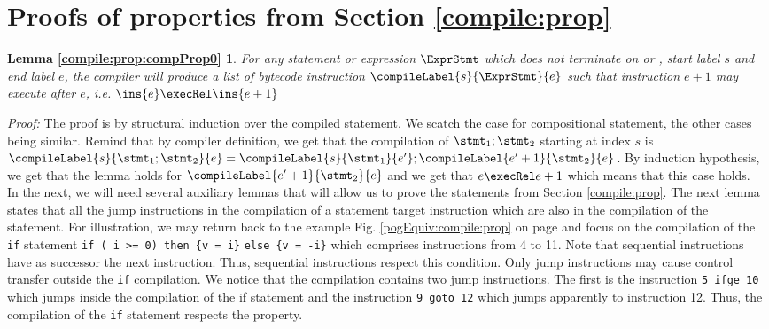 \newtheorem{compPropApp}{Lemma}[section]

\newtheorem*{compProp0A}{Lemma  \ref{compile:prop:compProp0}}
\newtheorem*{compProp3A}{Lemma  \ref{compile:prop:compProp3}}
\newtheorem*{compProp8A}{Lemma  \ref{compile:prop:compProp8}}
\newtheorem*{compProp9A}{Lemma  \ref{compile:prop:compProp4}}

\section{Proofs of properties from Section \ref{compile:prop} }\label{appendix:compile:prop}


\begin{compProp0A}%
 For any statement or expression $\ExprStmt$ which does not terminate on \return{} or \athrow, start label $s$ and end label $e$,
    the compiler will produce a list of bytecode instruction $\compileLabel{s}{\ExprStmt}{e}$ such that  instruction  $e+1$ may execute after
    $e$, i.e.   $ \ins{e} \execRel \ins{e+1}$
\end{compProp0A}
\textit{Proof:} 
The proof  is by structural induction over the compiled statement.
We scatch the case for compositional statement, the other cases being similar. 
Remind that by compiler definition, we get that the compilation of $\stmt_1; \stmt_2$ starting at index $s$ is
 $\compileLabel{s}{\stmt_1; \stmt_2}{e} = \compileLabel{s}{\stmt_1}{e'};\compileLabel{e'+1}{\stmt_2}{e}$.
By  induction hypothesis, we get that the lemma holds for $\compileLabel{e'+1}{\stmt_2}{e}$ and we get that $e \execRel e+1$ 
which means that this case holds.
\Qed \\


In the next, we will need several auxiliary lemmas that will allow us to prove the statements from Section \ref{compile:prop}. 
The next lemma states that all the jump instructions in the compilation of a statement target instruction which are also 
in the compilation of the statement.
For illustration, we may return back to the example Fig. \ref{pogEquiv:compile:prop}  on page \pageref{pogEquiv:compile:prop} and focus on the 
compilation of the \lstinline!if!  statement   
\lstinline!if ( i >= 0) then {v = i}! \lstinline!else {v = -i}! 
which comprises instructions from 4 to 11. Note that sequential instructions   have as  successor the next instruction.  Thus, sequential
instructions respect this condition. 
Only jump instructions may cause control transfer outside the \lstinline!if! compilation. 
We notice that the compilation contains two jump instructions. 
The first is the instruction \lstinline!5 ifge 10! which jumps inside the compilation of the if statement
and the instruction \lstinline!9 goto 12!  which jumps apparently to instruction 12. 
Thus, the compilation of the \lstinline!if! statement respects the property.


